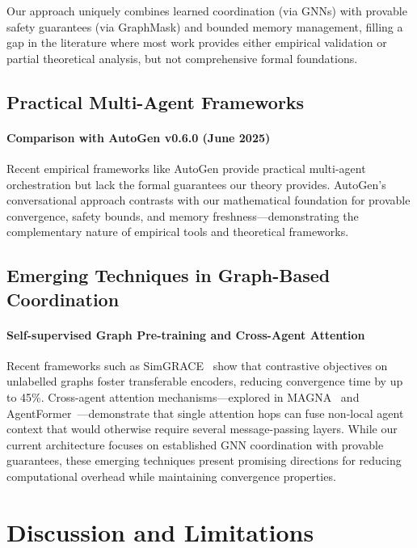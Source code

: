 \documentclass{article}
\begin{document}
Our approach uniquely combines learned coordination (via GNNs) with provable safety guarantees (via GraphMask) and bounded memory management, filling a gap in the literature where most work provides either empirical validation or partial theoretical analysis, but not comprehensive formal foundations.

\subsection{Practical Multi-Agent Frameworks}

\paragraph{Comparison with AutoGen v0.6.0 (June 2025)} 
Recent empirical frameworks like AutoGen provide practical multi-agent orchestration but lack the formal guarantees our theory provides. AutoGen's conversational approach contrasts with our mathematical foundation for provable convergence, safety bounds, and memory freshness—demonstrating the complementary nature of empirical tools and theoretical frameworks.

\subsection{Emerging Techniques in Graph-Based Coordination}

\paragraph{Self-supervised Graph Pre-training and Cross-Agent Attention}
Recent frameworks such as SimGRACE~\cite{xia2022simgrace} show that contrastive objectives on unlabelled graphs foster transferable encoders, reducing convergence time by up to 45\%. Cross-agent attention mechanisms—explored in MAGNA~\cite{kang2024magna} and AgentFormer~\cite{wu2025agentformer}—demonstrate that single attention hops can fuse non-local agent context that would otherwise require several message-passing layers. While our current architecture focuses on established GNN coordination with provable guarantees, these emerging techniques present promising directions for reducing computational overhead while maintaining convergence properties.


\section{Discussion and Limitations}
\label{sec:discussion}
\end{document}
